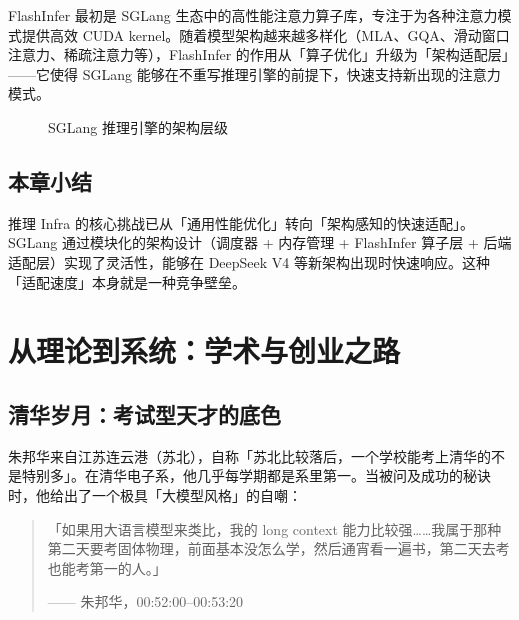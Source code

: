 \documentclass[a4paper]{article}
\begin{document}
FlashInfer 最初是 SGLang 生态中的高性能注意力算子库，专注于为各种注意力模式提供高效 CUDA kernel。随着模型架构越来越多样化（MLA、GQA、滑动窗口注意力、稀疏注意力等），FlashInfer 的作用从「算子优化」升级为「架构适配层」——它使得 SGLang 能够在不重写推理引擎的前提下，快速支持新出现的注意力模式。

\begin{figure}[H]
\centering
{}
\caption{SGLang 推理引擎的架构层级}
\end{figure}

\subsection{本章小结}
推理 Infra 的核心挑战已从「通用性能优化」转向「架构感知的快速适配」。SGLang 通过模块化的架构设计（调度器 + 内存管理 + FlashInfer 算子层 + 后端适配层）实现了灵活性，能够在 DeepSeek V4 等新架构出现时快速响应。这种「适配速度」本身就是一种竞争壁垒。

\section{从理论到系统：学术与创业之路}

\subsection{清华岁月：考试型天才的底色}

朱邦华来自江苏连云港（苏北），自称「苏北比较落后，一个学校能考上清华的不是特别多」。在清华电子系，他几乎每学期都是系里第一。当被问及成功的秘诀时，他给出了一个极具「大模型风格」的自嘲：

\begin{quote}
「如果用大语言模型来类比，我的 long context 能力比较强……我属于那种第二天要考固体物理，前面基本没怎么学，然后通宵看一遍书，第二天去考也能考第一的人。」\par
\hfill —— 朱邦华，00:52:00--00:53:20
\end{quote}
\end{document}
